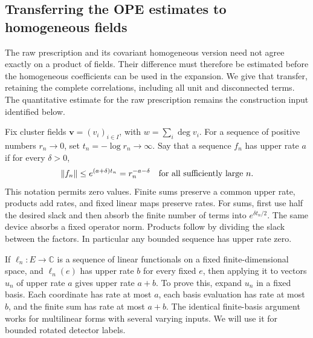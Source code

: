 \subsection{Transferring the OPE estimates to homogeneous fields}
\label{sec:ope-estimates}
The raw prescription and its covariant homogeneous version need not agree
exactly on a product of fields. Their difference must therefore be estimated
before the homogeneous coefficients can be used in the expansion. We give
that transfer, retaining the complete correlations, including all unit and
disconnected terms. The quantitative estimate for the raw prescription
remains the construction input identified below.

Fix cluster fields $\boldsymbol v=(v_i)_{i\in I}$, with
$w=\sum_i\deg v_i$. For a sequence of positive numbers $r_n\to0$, set $t_n=-\log r_n\to\infty$.
Say that a sequence $f_n$ has upper rate $a$ if for every $\delta>0$,
\[
 \|f_n\|\leq e^{(a+\delta)t_n}=r_n^{-a-\delta}
                 \quad\hbox{for all sufficiently large }n.
\]
This notation permits zero values. Finite sums preserve a common upper
rate, products add rates, and fixed linear maps preserve rates.
For sums, first use half the desired slack and then absorb the finite
number of terms into $e^{\delta t_n/2}$. The same device absorbs a fixed
operator norm. Products follow by dividing the slack between the factors.
In particular any bounded sequence has upper rate zero.

If $\ell_n:E\to\mathbb C$ is a sequence of linear functionals on a
fixed finite-dimensional space, and $\ell_n(e)$ has upper rate $b$ for
every fixed $e$, then applying it to vectors $u_n$ of upper rate $a$
gives upper rate $a+b$. To prove this, expand $u_n$ in a fixed basis.
Each coordinate has rate at most $a$, each basis evaluation has rate at
most $b$, and the finite sum has rate at most $a+b$. The identical
finite-basis argument works for multilinear forms with several varying
inputs. We will use it for bounded rotated detector labels.

